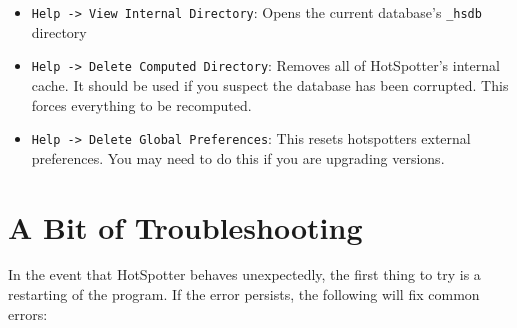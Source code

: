 \documentclass[a4paper,10pt]{article}
\begin{document}
\begin{itemize}
\item \verb+Help -> View Internal Directory+: 
    Opens the current database's {\tt \_hsdb} directory

\item \verb+Help -> Delete Computed Directory+: 
    Removes all of HotSpotter's internal cache. It should be used if you suspect
    the database has been corrupted. This forces everything to be recomputed. 

\item \verb+Help -> Delete Global Preferences+: 
    This resets hotspotters external preferences. You may need to do this if you
    are upgrading versions. 



\end{itemize}
  


\section{A Bit of Troubleshooting}

In the event that HotSpotter behaves unexpectedly, the first thing to try is a
restarting of the program. If the error persists, the following will fix common
errors: 
\end{document}
